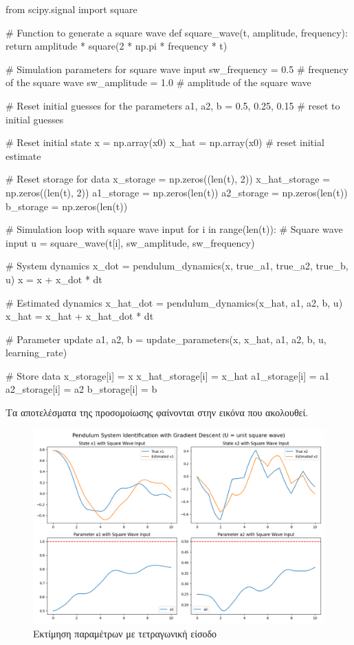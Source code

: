 \documentclass{article}
\begin{document}
\begin{python}
from scipy.signal import square

# Function to generate a square wave
def square_wave(t, amplitude, frequency):
    return amplitude * square(2 * np.pi * frequency * t)

# Simulation parameters for square wave input
sw_frequency = 0.5  # frequency of the square wave
sw_amplitude = 1.0  # amplitude of the square wave

# Reset initial guesses for the parameters
a1, a2, b = 0.5, 0.25, 0.15  # reset to initial guesses

# Reset initial state
x = np.array(x0)
x_hat = np.array(x0)  # reset initial estimate

# Reset storage for data
x_storage = np.zeros((len(t), 2))
x_hat_storage = np.zeros((len(t), 2))
a1_storage = np.zeros(len(t))
a2_storage = np.zeros(len(t))
b_storage = np.zeros(len(t))

# Simulation loop with square wave input
for i in range(len(t)):
    # Square wave input
    u = square_wave(t[i], sw_amplitude, sw_frequency)

    # System dynamics
    x_dot = pendulum_dynamics(x, true_a1, true_a2, true_b, u)
    x = x + x_dot * dt

    # Estimated dynamics
    x_hat_dot = pendulum_dynamics(x_hat, a1, a2, b, u)
    x_hat = x_hat + x_hat_dot * dt

    # Parameter update
    a1, a2, b = update_parameters(x, x_hat, a1, a2, b, u, learning_rate)

    # Store data
    x_storage[i] = x
    x_hat_storage[i] = x_hat
    a1_storage[i] = a1
    a2_storage[i] = a2
    b_storage[i] = b
\end{python}

Τα αποτελέσματα της προσομοίωσης φαίνονται στην εικόνα που ακολουθεί.

\begin{figure}[h]
    \centering
    \includegraphics[width=\textwidth]{./estimation-square-wave-input.png}
    \caption{Εκτίμηση παραμέτρων με τετραγωνική είσοδο}
\end{figure}
\end{document}
